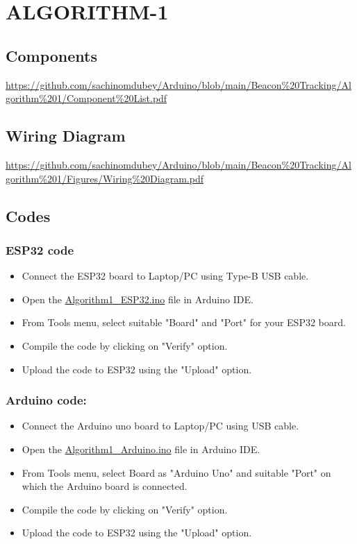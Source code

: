 \documentclass[journal,12pt,twocolumn]{IEEEtran}
\begin{document}
\section{ALGORITHM-1}
\subsection{\textbf{Components}}
\url{https://github.com/sachinomdubey/Arduino/blob/main/Beacon\%20Tracking/Algorithm\%201/Component\%20List.pdf}
\subsection{\textbf{Wiring Diagram}}
\url{https://github.com/sachinomdubey/Arduino/blob/main/Beacon%20Tracking/Algorithm%201/Figures/Wiring%20Diagram.pdf}
\subsection{\textbf{Codes}}
\subsubsection{\textbf{ESP32 code}}
\begin{itemize}
    \item Connect the ESP32 board to Laptop/PC using Type-B USB cable.
    \item Open the \href{https://github.com/sachinomdubey/Arduino/blob/main/Beacon%20Tracking/Algorithm%201/Codes/Algorithm1_ESP32.ino}{Algorithm1\_ESP32.ino} file in Arduino IDE. 
    \item From Tools menu, select suitable "Board" and "Port" for your ESP32 board.
    \item Compile the code by clicking on "Verify" option.
    \item Upload the code to ESP32 using the "Upload" option.
\end{itemize}
\subsubsection{\textbf{Arduino code:}}
\begin{itemize}
    \item Connect the Arduino uno board to Laptop/PC using USB cable.
    \item Open the \href{https://github.com/sachinomdubey/Arduino/blob/main/Beacon%20Tracking/Algorithm%201/Codes/Algorithm1_Arduino.ino}{Algorithm1\_Arduino.ino} file in Arduino IDE. 
    \item From Tools menu, select Board as "Arduino Uno" and suitable "Port" on which the Arduino board is connected.
    \item Compile the code by clicking on "Verify" option.
    \item Upload the code to ESP32 using the "Upload" option.
\end{itemize}
\end{document}
